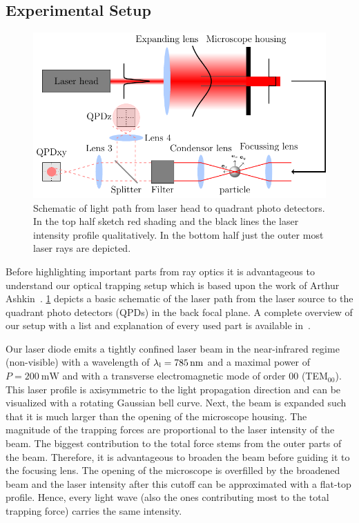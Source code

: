 \subsection{Experimental Setup}

\begin{figure}[htp]
  \centering
  \includegraphics[]{Plots/cache/setup.pdf}
  \caption{Schematic of light path from laser head to quadrant photo detectors. 
  In the top half sketch red shading and the black lines the laser intensity 
profile qualitatively. In the bottom half just the outer most laser rays are 
depicted.}
  \label{fig:Th-setup}
\end{figure}

Before highlighting important parts from ray optics it is advantageous to 
understand our optical trapping setup which is based upon the work of Arthur 
Ashkin~\cite{Ashkin1978,Ashkin1987,Ashkin2002,Ashkin1986,Ashkin1992,Ashkin1997}. 
\cref{fig:Th-setup} depicts a basic schematic of the laser path from the laser 
source to the quadrant photo detectors (QPDs) in the back focal plane. A 
complete overview of our setup with a list and explanation of every used part 
is available in~\cite{Lamprecht2017}.

Our laser diode emits a tightly confined laser beam in the near-infrared regime 
(non-visible) with a wavelength of $\lal=\SI{785}{\nm}$ and a maximal power of 
$P=\SI{200}{\milli\watt}$ and with a transverse electromagnetic mode of order 
00 (TEM$_{00}$). This laser profile is axisymmetric to the light propagation 
direction and can be visualized with a rotating Gaussian bell curve. Next, the 
beam is expanded such that it is much larger than the opening of the microscope 
housing. The magnitude of the trapping forces are proportional to the laser 
intensity of the beam. The biggest contribution to the total force stems from 
the outer parts of the beam. Therefore, it is advantageous to broaden the beam 
before guiding it to the focusing lens. The opening of the microscope is 
overfilled by the broadened beam and the laser intensity after this cutoff can 
be approximated with a flat-top profile. Hence, every light wave (also the ones 
contributing most to the total trapping force) carries the same intensity.

